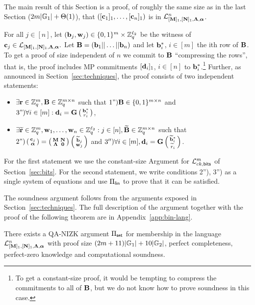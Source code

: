 The main result of this Section is a proof, of roughly the same size as in the last Section ($2{m}|\mathbb{G}_1|+\Theta(1)$), that  $([\mathbf{c}_1]_1,\ldots,[\mathbf{c}_n]_1)$ is in $\mathcal{L}_{[\mathbf{{M}}]_1,[\mathbf{{N}}]_1,\mathbf{{\Lambda}},{\boldsymbol \alpha}}^n$.

For all $j \in [n]$, let $(\mathbf{b}_j,\mathbf{w}_j) \in \{0,1\}^{{m}} \times \mathbb{Z}_q^{{\ell_2}}$ be the witness of $\mathbf{c}_j \in \mathcal{L}_{[\mathbf{{M}}]_1,[\mathbf{{N}}]_1,\mathbf{{\Lambda}},{\boldsymbol \alpha}}.$ Let $\mathbf{{B}}=(\mathbf{b}_1|| \ldots ||\mathbf{b}_n)$ and let $\mathbf{b}^*_{i}$, $i \in [m]$ the ith row of $\mathbf{{B}}$. To get a proof of size independent of $n$ we commit to $\mathbf{{B}}$ ``compressing the rows'', that is, the proof includes MP commitments $[\mathbf{d}_i]_1$, $i \in [n]$ to $\mathbf{b}_i^*$.\footnote{To get a constant-size proof, it would be tempting to compress the commitments to all of $\mathbf{{B}}$, but we do not know how to prove soundness in this case.} Further, as announced in Section~\ref{sec:techniques}, the proof consists of two independent statements:
\begin{itemize}
\item $\exists \mathbf{r} \in \mathbb{Z}_q^{m}, \mathbf{{B}} \in \mathbb{Z}_q^{{m} \times n}$ such that  
$\text{1'')} \mathbf{{B}} \in \{0,1\}^{{m} \times n}$ and $\text{3'')} \forall i \in [{m}]: \mathbf{d}_i=\mathbf{{G}}\left(\begin{smallmatrix}\mathbf{b}_i^*  \\ r_i\end{smallmatrix}\right)$,
\item $\exists \widetilde{\mathbf{r}} \in \mathbb{Z}_q^{m}, \mathbf{w}_1,\ldots,\mathbf{w}_n \in\mathbb{Z}_q^{\ell_2}: j \in [n], \widetilde{\mathbf{{B}}} \in \mathbb{Z}_q^{{m} \times n}$ such that  
   $\text{2'')} \left(\begin{smallmatrix}
    \mathbf{c}_j\\
    {\boldsymbol \alpha}
\end{smallmatrix}\right)
=
\left(\begin{smallmatrix}
    \mathbf{{M}}       & \mathbf{{N}}\\
    \mathbf{{\Lambda}} & \mathbf{{0}}
\end{smallmatrix}\right)
\left(\begin{smallmatrix}
    \widetilde{\mathbf{b}}_j\\
    \mathbf{w}_j
\end{smallmatrix}\right)$ and $3'') \forall i \in [{m}], \mathbf{d}_i=\mathbf{{G}}   \left(\begin{smallmatrix}\widetilde{\mathbf{b}}^*_i  \\ \widetilde{r}_i\end{smallmatrix}\right)  $.
\end{itemize} 
For the first statement we use the constant-size Argument for $\mathcal{L}_{ck,\mathsf{bits}}^m$ of Section~\ref{sec:bits}. For the second statement, we write conditions 2''), 3'') as a single system of equations and use $\Pi_{\mathsf{lin}}$ to prove that it can be satisfied.  

The soundness argument follows from the arguments exposed in Section~\ref{sec:techniques}. The full description of the argument together with the proof of the following theorem are in Appendix~\ref{app:bin-lang}.

\begin{theorem} \label{theo:aggset} There exists a QA-NIZK argument $\Pi_{\mathsf{set}}$ for membership in the language $\mathcal{L}_{[\mathbf{{M}}]_1,[\mathbf{{N}}]_1,\mathbf{{\Lambda}},{\boldsymbol \alpha}}^n$ with proof size  $(2{m}+11)|\mathbb{G}_1|+10|\mathbb{G}_2|$, perfect completeness, perfect-zero knowledge and computational soundness. 
\end{theorem}

